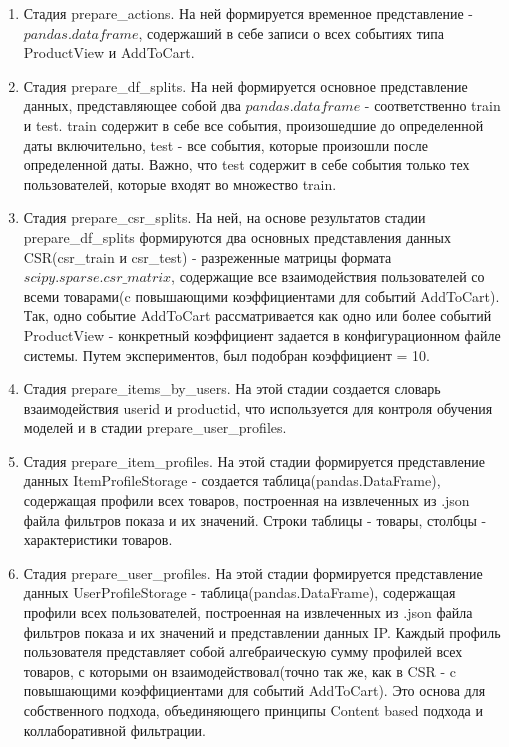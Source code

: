 \documentclass[14pt]{mmcs_article}
\newenvironment{myenumerate}
{ \begin{enumerate}
		\setlength{\itemsep}{0pt}
		\setlength{\parskip}{0pt}
		\setlength{\parsep}{0pt}     }
	{ \end{enumerate}                  }
\begin{document}
\begin{myenumerate}
	\item Стадия prepare\_actions. На ней формируется временное представление - $pandas$.$dataframe$, содержаший в себе записи о всех событиях типа  ProductView и AddToCart.
	\item Стадия prepare\_df\_splits. На ней формируется основное представление данных, представляющее собой два  $pandas$.$dataframe$ - соответственно train и test. train содержит в себе все события, произошедшие до определенной даты включительно, test - все события, которые произошли после определенной даты. Важно, что test содержит в себе события только тех пользователей, которые входят во множество train. 
	\item Стадия prepare\_csr\_splits. На ней, на основе результатов стадии prepare\_df\_splits формируются два основных представления данных CSR(csr\_train и csr\_test) - разреженные матрицы формата \\$scipy$.$sparse$.$csr\_matrix$, содержащие все взаимодействия пользователей со всеми товарами(c повышающими коэффициентами для событий AddToCart). Так, одно событие AddToCart рассматривается как одно или более событий ProductView - конкретный коэффициент задается в конфигурационном файле системы. Путем экспериментов, был подобран коэффициент = 10.
	\item Стадия prepare\_items\_by\_users. На этой стадии создается словарь взаимодействия userid и productid, что используется для контроля обучения моделей и в стадии prepare\_user\_profiles.
	\item Стадия prepare\_item\_profiles. На этой стадии формируется представление данных ItemProfileStorage - создается таблица(pandas.DataFrame), содержащая профили всех товаров, построенная на извлеченных из .json файла фильтров показа и их значений. Строки таблицы - товары, столбцы - характеристики товаров. 
	\item Стадия prepare\_user\_profiles. На этой стадии формируется представление данных UserProfileStorage - таблица(pandas.DataFrame), содержащая профили всех пользователей, построенная на извлеченных из .json файла фильтров показа и их значений и представлении данных IP. Каждый профиль пользователя представляет собой алгебраическую сумму профилей всех товаров, с которыми он взаимодействовал(точно так же, как в CSR - c повышающими коэффициентами для событий AddToCart). Это основа для собственного подхода, объединяющего принципы Content based подхода и коллаборативной фильтрации.
	
\end{myenumerate}
\end{document}
